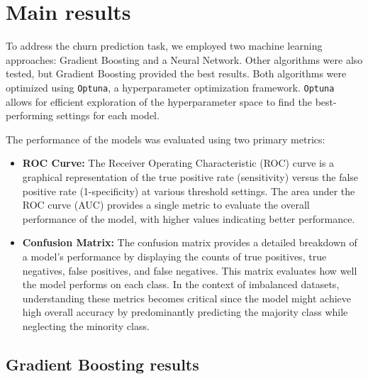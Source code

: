 \documentclass[12pt]{article}
\begin{document}
\section{Main results}
To address the churn prediction task, we employed two machine learning approaches: Gradient Boosting and a Neural Network. Other algorithms were also tested, but Gradient Boosting provided the best results. Both algorithms were optimized using \texttt{Optuna}, a hyperparameter optimization framework. \texttt{Optuna} allows for efficient exploration of the hyperparameter space to find the best-performing settings for each model.

The performance of the models was evaluated using two primary metrics:
\begin{itemize}
    \item \textbf{ROC Curve:} The Receiver Operating Characteristic (ROC) curve is a graphical representation of the true positive rate (sensitivity) versus the false positive rate (1-specificity) at various threshold settings. The area under the ROC curve (AUC) provides a single metric to evaluate the overall performance of the model, with higher values indicating better performance.
    \item \textbf{Confusion Matrix:} The confusion matrix provides a detailed breakdown of a model's performance by displaying the counts of true positives, true negatives, false positives, and false negatives. This matrix evaluates how well the model performs on each class. In the context of imbalanced datasets, understanding these metrics becomes critical since the model might achieve high overall accuracy by predominantly predicting the majority class while neglecting the minority class. 
\end{itemize}

\subsection{Gradient Boosting results}
\end{document}
